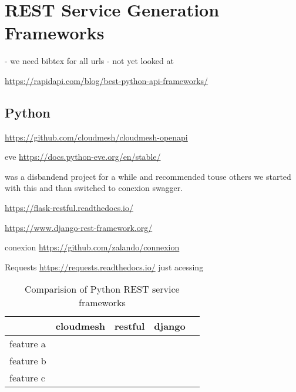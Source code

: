 \section{REST Service Generation Frameworks}

- we need bibtex for all urls
- not yet looked at

\url{https://rapidapi.com/blog/best-python-api-frameworks/}

\subsection{Python}

\begin{description}

\item[tornado]
\item[fastapi]
\item[Sanic]
\item[falcon]
\item[bottle]
\item[hug]
\item[turbogears]
\item[web2py]
\item[pyramid]

\item[cloudmesh]

\url{https://github.com/cloudmesh/cloudmesh-openapi} 

\item {eve} \url{https://docs.python-eve.org/en/stable/}

was a disbandend project for a while and recommended touse others we started with this and than switched to conexion swagger.

\item[restful]

\url{https://flask-restful.readthedocs.io/}

\item[django] \url{https://www.django-rest-framework.org/}

\item{conexion} \url{https://github.com/zalando/connexion}

\item{Requests} \url{https://requests.readthedocs.io/}  just acessing

\end{description}

\begin{table}[htb]

\caption{Comparision of Python REST service frameworks}

\begin{tabular}{|l|l|l|l|l|}
\hline

 & cloudmesh &  restful &  django &  \\ \hline
 feature a &  &  &  &  \\ \hline
 feature b &  &  &  &  \\ \hline
 feature c &  &  &  &  \\ \hline
\end{tabular}

\end{table}
